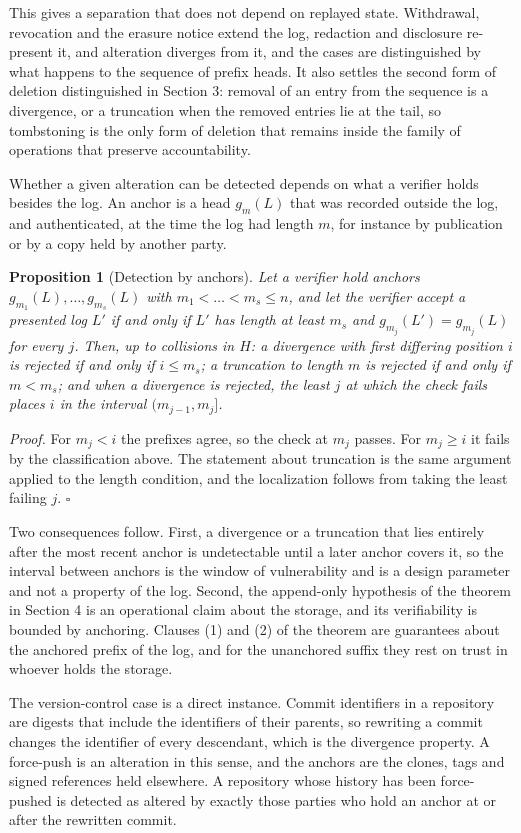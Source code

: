 \documentclass[11pt]{article}
\theoremstyle{plain}
\newtheorem{proposition}{Proposition}
\theoremstyle{definition}
\theoremstyle{remark}
\begin{document}
This gives a separation that does not depend on replayed state. Withdrawal, revocation and the erasure notice extend the log, redaction and disclosure re-present it, and alteration diverges from it, and the cases are distinguished by what happens to the sequence of prefix heads. It also settles the second form of deletion distinguished in Section 3: removal of an entry from the sequence is a divergence, or a truncation when the removed entries lie at the tail, so tombstoning is the only form of deletion that remains inside the family of operations that preserve accountability.

Whether a given alteration can be detected depends on what a verifier holds besides the log. An anchor is a head $g_m(L)$ that was recorded outside the log, and authenticated, at the time the log had length $m$, for instance by publication or by a copy held by another party.

\begin{proposition}[Detection by anchors]
Let a verifier hold anchors $g_{m_1}(L),\dots,g_{m_s}(L)$ with $m_1<\dots<m_s\le n$, and let the verifier accept a presented log $L'$ if and only if $L'$ has length at least $m_s$ and $g_{m_j}(L')=g_{m_j}(L)$ for every $j$. Then, up to collisions in $H$: a divergence with first differing position $i$ is rejected if and only if $i\le m_s$; a truncation to length $m$ is rejected if and only if $m<m_s$; and when a divergence is rejected, the least $j$ at which the check fails places $i$ in the interval $(m_{j-1},m_j]$.
\end{proposition}
\emph{Proof.} For $m_j<i$ the prefixes agree, so the check at $m_j$ passes. For $m_j\ge i$ it fails by the classification above. The statement about truncation is the same argument applied to the length condition, and the localization follows from taking the least failing $j$. \hfill$\square$

Two consequences follow. First, a divergence or a truncation that lies entirely after the most recent anchor is undetectable until a later anchor covers it, so the interval between anchors is the window of vulnerability and is a design parameter and not a property of the log. Second, the append-only hypothesis of the theorem in Section 4 is an operational claim about the storage, and its verifiability is bounded by anchoring. Clauses (1) and (2) of the theorem are guarantees about the anchored prefix of the log, and for the unanchored suffix they rest on trust in whoever holds the storage.

The version-control case is a direct instance. Commit identifiers in a repository are digests that include the identifiers of their parents, so rewriting a commit changes the identifier of every descendant, which is the divergence property. A force-push is an alteration in this sense, and the anchors are the clones, tags and signed references held elsewhere. A repository whose history has been force-pushed is detected as altered by exactly those parties who hold an anchor at or after the rewritten commit.
\end{document}
